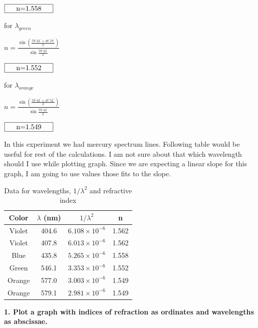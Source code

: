 \documentclass[a4paper,12pt]{report}
\begin{document}
\begin{center}
	$\framebox[70pt]{n=1.558}$
\end{center}
for $\lambda_{green}$
\begin{center}
	{\large 	$n=\frac{\sin(\frac{59^{\circ}42^{\prime}+48^{\circ}19^{\prime}}{2})}{\sin\frac{59^{\circ}42^{\prime}}{2}}$}
\end{center}
\begin{center}
	$\framebox[70pt]{n=1.552}$
\end{center}
for $\lambda_{orange}$
\begin{center}
	{\large 	$n=\frac{\sin(\frac{59^{\circ}42^{\prime}+47^{\circ}52^{\prime}}{2})}{\sin\frac{59^{\circ}42^{\prime}}{2}}$}
\end{center}
\begin{center}
	$\framebox[70pt]{n=1.549}$
\end{center}
In this experiment we had mercury spectrum lines. Following table would be useful for rest of the calculations. I am not sure about that which wavelength should I use while plotting graph. Since we are expecting a linear slope for this graph, I am going to use values those fits to the slope.
\newpage
\begin{table}[h]
\begin{center}
	\begin{tabular}{|c|c|c|c|}
	\hline Color & $\lambda$ (nm) & $1/\lambda^{2}$ & n \\ 
	\hline Violet & 404.6 & $6.108\times10^{-6}$ & 1.562 \\ 
	\hline Violet & 407.8 & $6.013\times10^{-6}$ & 1.562 \\ 
	\hline Blue & 435.8 & $5.265\times10^{-6}$ & 1.558 \\ 
	\hline Green & 546.1 & $3.353\times10^{-6}$ & 1.552 \\ 
	\hline Orange & 577.0 & $3.003\times10^{-6}$ & 1.549 \\ 
	\hline Orange & 579.1 & $2.981\times10^{-6}$ & 1.549 \\ 
	\hline 
\end{tabular}
\end{center} 
\caption{Data for wavelengths, $1/\lambda^{2}$ and refractive index}
\end{table}
\textbf{1. Plot a graph with indices of refraction as ordinates and wavelengths as abscissae.}
\end{document}
